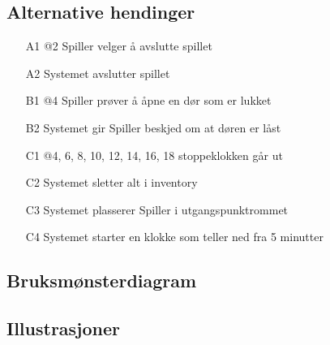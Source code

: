 \documentclass[a4paper]{article}
\begin{document}
\subsection{Alternative hendinger}
\begin{itemize}
\item[A1] @2 Spiller velger å avslutte spillet
\item[A2] Systemet avslutter spillet
\item[B1] @4 Spiller prøver å åpne en dør som er lukket
\item[B2] Systemet gir Spiller beskjed om at døren er låst
\item[C1] @4, 6, 8, 10, 12, 14, 16, 18 stoppeklokken går ut
\item[C2] Systemet sletter alt i inventory
\item[C3] Systemet plasserer Spiller i utgangspunktrommet
\item[C4] Systemet starter en klokke som teller ned fra 5 minutter
\end{itemize}

\subsection{Bruksmønsterdiagram}


\subsection{Illustrasjoner}
 
\end{document}
